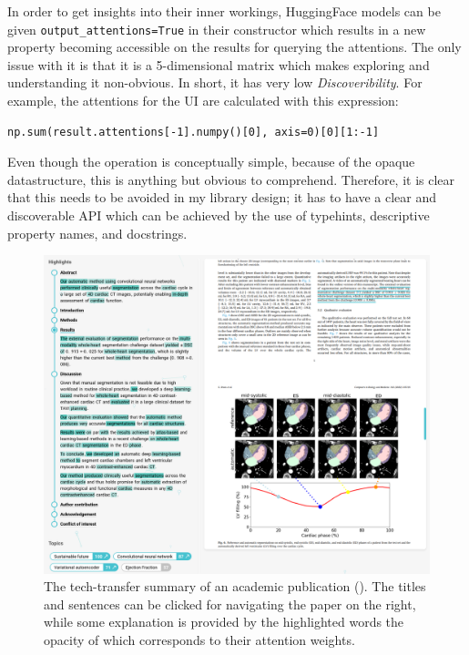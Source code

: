 \begin{displayquote}
In order to get insights into their inner workings, HuggingFace models can be given \texttt{output\_attentions=True} in their constructor which results in a new property becoming accessible on the results for querying the attentions. The only issue with it is that it is a 5-dimensional matrix which makes exploring and understanding it non-obvious. In short, it has very low \textit{Discoveribility}. For example, the attentions for the UI are calculated with this expression:
\begin{verbatim}
np.sum(result.attentions[-1].numpy()[0], axis=0)[0][1:-1]
\end{verbatim}
Even though the operation is conceptually simple, because of the opaque datastructure, this is anything but obvious to comprehend. Therefore, it is clear that this needs to be avoided in my library design; it has to have a clear and discoverable API which can be achieved by the use of typehints, descriptive property names, and docstrings.
\end{displayquote}

\begin{figure}
    \centering
    \includegraphics[width=0.9\linewidth]{figures/dashboard-highlights.png}
    \caption{The tech-transfer summary of an academic publication (\cite{bruns2022deep}). The titles and sentences can be clicked for navigating the paper on the right, while some explanation is provided by the highlighted words the opacity of which corresponds to their attention weights.}
    \label{fig:dashboard-highlights}
\end{figure}

